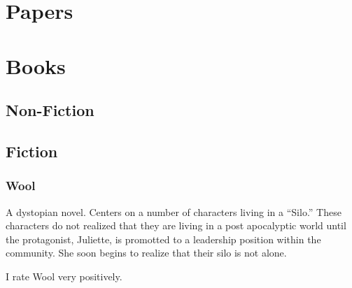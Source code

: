 \documentclass[12pt]{article}
\begin{document}
\section{Papers}

\section{Books}

\subsection{Non-Fiction}

\subsection{Fiction}

\subsubsection{Wool}



A dystopian novel. Centers on a number of characters living in a
``Silo.'' These characters do not realized that they are living in a
post apocalyptic world until the protagonist, Juliette, is promotted
to a leadership position within the community. She soon begins to
realize that their silo is not alone.

I rate Wool very positively.
\end{document}
